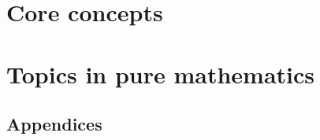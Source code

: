 \documentclass[10pt]{book}
\begin{document}
% 

\frontmatter


\restoregeometry

\clearpage



\tableofcontents




\mainmatter

\setcounter{chapter}{-1}



\part{Core concepts}
\label{ptCoreConcepts}







\part{Topics in pure mathematics}
\label{ptTopics}









\appendix

\begin{appendices}

\renewcommand{\sectionmark}[1]{\markboth{\leftmark}{Section \thesection.\ #1}}
\renewcommand{\chaptermark}[1]{\markboth{Appendix \thechapter.\ #1}{\rightmark}}

\part*{Appendices}






\end{appendices}
\end{document}
